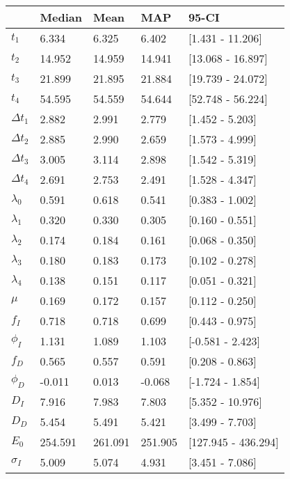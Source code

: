 \begin{tabular}{lllll}
\toprule
{} &   Median &     Mean &      MAP &                95-CI \\
\midrule
$t_1$        &    6.334 &    6.325 &    6.402 &     [1.431 - 11.206] \\
$t_2$        &   14.952 &   14.959 &   14.941 &    [13.068 - 16.897] \\
$t_3$        &   21.899 &   21.895 &   21.884 &    [19.739 - 24.072] \\
$t_4$        &   54.595 &   54.559 &   54.644 &    [52.748 - 56.224] \\
$\Delta t_1$ &    2.882 &    2.991 &    2.779 &      [1.452 - 5.203] \\
$\Delta t_2$ &    2.885 &    2.990 &    2.659 &      [1.573 - 4.999] \\
$\Delta t_3$ &    3.005 &    3.114 &    2.898 &      [1.542 - 5.319] \\
$\Delta t_4$ &    2.691 &    2.753 &    2.491 &      [1.528 - 4.347] \\
$\lambda_0$  &    0.591 &    0.618 &    0.541 &      [0.383 - 1.002] \\
$\lambda_1$  &    0.320 &    0.330 &    0.305 &      [0.160 - 0.551] \\
$\lambda_2$  &    0.174 &    0.184 &    0.161 &      [0.068 - 0.350] \\
$\lambda_3$  &    0.180 &    0.183 &    0.173 &      [0.102 - 0.278] \\
$\lambda_4$  &    0.138 &    0.151 &    0.117 &      [0.051 - 0.321] \\
$\mu$        &    0.169 &    0.172 &    0.157 &      [0.112 - 0.250] \\
$f_I$        &    0.718 &    0.718 &    0.699 &      [0.443 - 0.975] \\
$\phi_I$     &    1.131 &    1.089 &    1.103 &     [-0.581 - 2.423] \\
$f_D$        &    0.565 &    0.557 &    0.591 &      [0.208 - 0.863] \\
$\phi_D$     &   -0.011 &    0.013 &   -0.068 &     [-1.724 - 1.854] \\
$D_I$        &    7.916 &    7.983 &    7.803 &     [5.352 - 10.976] \\
$D_D$        &    5.454 &    5.491 &    5.421 &      [3.499 - 7.703] \\
$E_0$        &  254.591 &  261.091 &  251.905 &  [127.945 - 436.294] \\
$\sigma_I$   &    5.009 &    5.074 &    4.931 &      [3.451 - 7.086] \\

\end{tabular}
